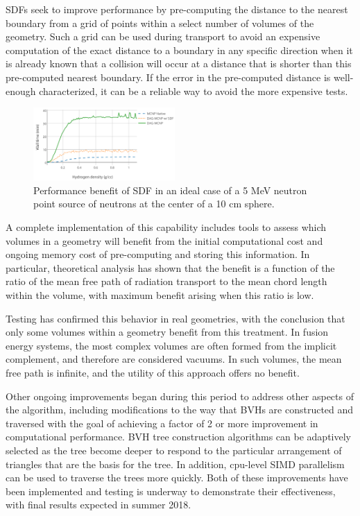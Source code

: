 \glspl{SDF} seek to improve performance by pre-computing the distance to the
nearest boundary from a grid of points within a select number of volumes of
the geometry.  Such a grid can be used during transport to avoid an expensive
computation of the exact distance to a boundary in any specific direction when
it is already known that a collision will occur at a distance that is shorter
than this pre-computed nearest boundary.  If the error in the pre-computed
distance is well-enough characterized, it can be a reliable way to avoid the
more expensive tests.

\begin{figure}
\centering
\includegraphics[width=0.48\textwidth]{imgs/sdf-best-case.png}
\caption{\label{fig:sdf-best-case}Performance benefit of \gls{SDF} in an ideal
  case of a 5 MeV neutron point source of neutrons at the center of a 10 cm
  sphere.}
\end{figure}

A complete implementation of this capability includes tools to assess which
volumes in a geometry will benefit from the initial computational cost and
ongoing memory cost of pre-computing and storing this information.  In
particular, theoretical analysis has shown that the benefit is a function of
the ratio of the mean free path of radiation transport to the mean chord
length within the volume, with maximum benefit arising when this ratio is
low.

Testing has confirmed this behavior in real geometries, with the conclusion
that only some volumes within a geometry benefit from this treatment.  In
fusion energy systems, the most complex volumes are often formed from the
implicit complement, and therefore are considered vacuums.  In such volumes,
the mean free path is infinite, and the utility of this approach offers no
benefit.

Other ongoing improvements began during this period to address other aspects
of the algorithm, including modifications to the way that \glspl{BVH} are
constructed and traversed with the goal of achieving a factor of 2 or more
improvement in computational performance.  \gls{BVH} tree construction
algorithms can be adaptively selected as the tree become deeper to respond to
the particular arrangement of triangles that are the basis for the tree.  In
addition, cpu-level \gls{SIMD} parallelism can be used to traverse the trees
more quickly. Both of these improvements have been
implemented and testing is underway to demonstrate their effectiveness, with
final results expected in summer 2018.

